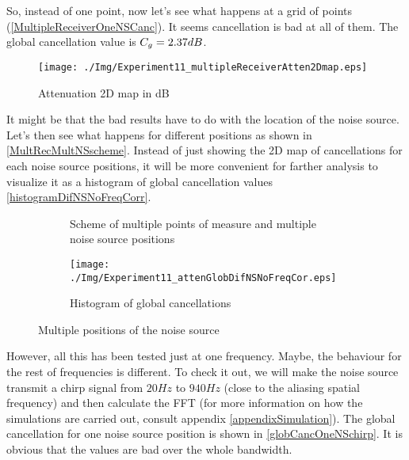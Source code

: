 So, instead of one point, now let's see what happens at a grid of points (\autoref{MultipleReceiverOneNSCanc}). It seems cancellation is bad at all of them. The global cancellation value is $C_g = 2.37 dB$. 

\begin{figure}
	\centering			\texttt{[image: ./Img/Experiment11\_multipleReceiverAtten2Dmap.eps]}
	\caption[Attenuation 2D map]{Attenuation 2D map in dB}
	\label{MultipleReceiverOneNSCanc}
\end{figure}

It might be that the bad results have to do with the location of the noise source. Let's then see what happens for different positions as shown in \autoref{MultRecMultNSscheme}. Instead of just showing the 2D map of cancellations for each noise source positions, it will be more convenient for farther analysis to visualize it as a histogram of global cancellation values
\autoref{histogramDifNSNoFreqCorr}.

\begin{figure}
	\centering
	\begin{subfigure}[b]{0.49\textwidth}
	\centering
	\caption[Scheme of multiple points of measure and multiple noise source positions]{Scheme of multiple points of measure and multiple noise source positions}
	\label{MultRecMultNSscheme}
	\end{subfigure}
	\begin{subfigure}[b]{0.49\textwidth}
	\centering
	\texttt{[image: ./Img/Experiment11\_attenGlobDifNSNoFreqCor.eps]}
	\caption{Histogram of global cancellations}
	\label{histogramDifNSNoFreqCorr}
	\end{subfigure}
	\caption{Multiple positions of the noise source}
\end{figure}

However, all this has been tested just at one frequency. Maybe, the behaviour for the rest of frequencies is different. To check it out, we will make the noise source transmit a chirp signal from $20 \si{Hz}$ to $940 \si{Hz}$ (close to the aliasing spatial frequency) and then calculate the FFT (for more information on how the simulations are carried out, consult appendix \autoref{appendixSimulation}). The global cancellation for one noise source position is shown in \autoref{globCancOneNSchirp}. It is obvious that the values are bad over the whole bandwidth.

